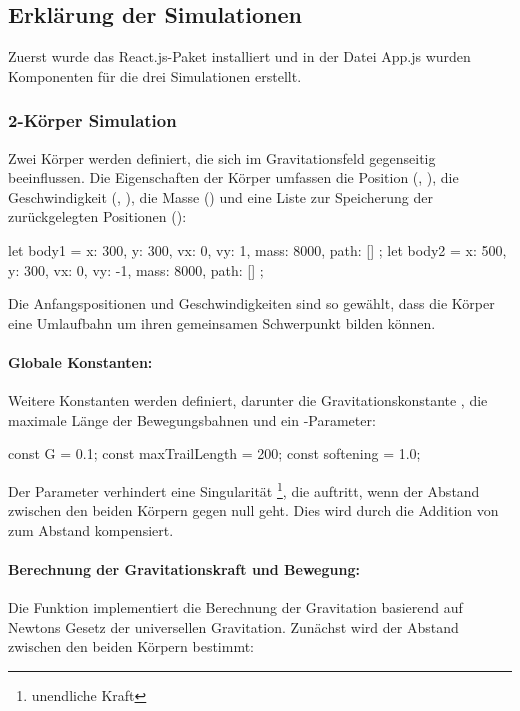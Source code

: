 \documentclass[a4paper,12pt,twoside]{article}
\begin{document}
\subsection{Erklärung der Simulationen}
Zuerst wurde das React.js-Paket installiert und in der Datei App.js wurden Komponenten 
für die drei Simulationen erstellt.
\subsubsection{2-Körper Simulation}
Zwei Körper werden definiert, die sich im Gravitationsfeld gegenseitig beeinflussen. 
Die Eigenschaften der Körper umfassen die Position (, ), 
die Geschwindigkeit (, ), die Masse () 
und eine Liste zur Speicherung der zurückgelegten Positionen ():

\begin{javascript}
let body1 = { x: 300, y: 300, vx: 0, vy: 1, mass: 8000, path: [] };
let body2 = { x: 500, y: 300, vx: 0, vy: -1, mass: 8000, path: [] };
\end{javascript}

Die Anfangspositionen und Geschwindigkeiten sind so gewählt, dass die Körper eine 
Umlaufbahn um ihren gemeinsamen Schwerpunkt bilden können.

\paragraph{Globale Konstanten:}
Weitere Konstanten werden definiert, darunter die Gravitationskonstante , 
die maximale Länge der Bewegungsbahnen und ein -Parameter:

\begin{javascript}
const G = 0.1;
const maxTrailLength = 200;
const softening = 1.0;
\end{javascript}

Der Parameter  verhindert eine Singularität \footnote{unendliche Kraft}, 
die auftritt, wenn der Abstand zwischen den beiden Körpern gegen null geht. 
Dies wird durch die Addition von  zum Abstand kompensiert.

\paragraph{Berechnung der Gravitationskraft und Bewegung:}
Die Funktion  implementiert die Berechnung der Gravitation 
basierend auf Newtons Gesetz der universellen Gravitation. Zunächst wird der 
Abstand zwischen den beiden Körpern bestimmt:
\end{document}
